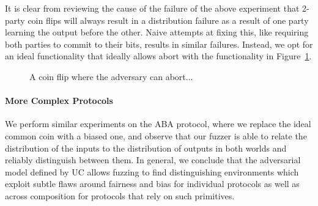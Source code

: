 {It is clear from reviewing the cause of the failure of the above experiment that 2-party coin flips will always result in a distribution failure as a result of one party learning the output before the other.
Naive attempts at fixing this, like requiring both parties to commit to their bits, results in similar failures.
Instead, we opt for an ideal functionality that ideally allows abort with the functionality in Figure~\ref{fig:fcoinabort}.

\begin{figure}
\centering

\caption{A coin flip where the adversary can abort...}
\label{fig:fcoinabort}
\end{figure}

\paragraph{More Complex Protocols}
We perform similar experiments on the ABA protocol, where we replace the ideal
common coin with a biased one, and observe that our fuzzer is able to relate
the distribution of the inputs to the distribution of outputs in both worlds
and reliably distinguish between them.  In general, we conclude that the
adversarial model defined by UC allows fuzzing to find distinguishing
environments which exploit subtle flaws around fairness and bias for individual
protocols as well as across composition for protocols that rely on such
primitives. 

\begin{figure*}
\centering

\end{figure*}



%

}
